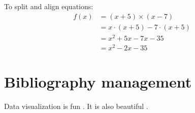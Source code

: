 \documentclass[12pt, a4paper]{article}
\begin{document}
To split and align equations:
\begin{equation}
    \begin{split}
        f(x) & = (x + 5) \times (x - 7) \\
             & = x \cdot (x + 5)  - 7 \cdot (x + 5)  \\
             & = x^2 + 5x - 7x - 35 \\
             & = x^2 - 2x - 35
    \end{split}
\end{equation}

\section{Bibliography management}
Data visualization is fun \parencite{wilke_fundamentals_2019}. It is also beautiful \parencite{healy_data_2018}.


\printbibliography

\end{document}
